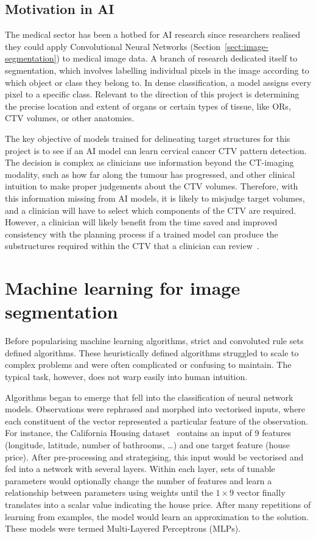 \documentclass[12pt,twoside]{report}
\begin{document}
\subsection{Motivation in AI}

The medical sector has been a hotbed for AI research since researchers realised they could apply Convolutional Neural Networks (Section~\ref{sect:image-segmentation}) to medical image data. A branch of research dedicated itself to segmentation, which involves labelling individual pixels in the image according to which object or class they belong to. In dense classification, a model assigns every pixel to a specific class. Relevant to the direction of this project is determining the precise location and extent of organs or certain types of tissue, like ORs, CTV volumes, or other anatomies. 

The key objective of models trained for delineating target structures for this project is to see if an AI model can learn cervical cancer CTV pattern detection. The decision is complex as clinicians use information beyond the CT-imaging modality, such as how far along the tumour has progressed, and other clinical intuition to make proper judgements about the CTV volumes. Therefore, with this information missing from AI models, it is likely to misjudge target volumes, and a clinician will have to select which components of the CTV are required. However, a clinician will likely benefit from the time saved and improved consistency with the planning process if a trained model can produce the substructures required within the CTV that a clinician can review~\cite{AMLART-data}.

\section{Machine learning for image segmentation}\label{sect:machine-learning-for-image-segmentation}

Before popularising machine learning algorithms, strict and convoluted rule sets defined algorithms. These heuristically defined algorithms struggled to scale to complex problems and were often complicated or confusing to maintain. The typical task, however, does not warp easily into human intuition.

Algorithms began to emerge that fell into the classification of neural network models. Observations were rephrased and morphed into vectorised inputs, where each constituent of the vector represented a particular feature of the observation. For instance, the California Housing dataset~\cite{kelleypace1997} contains an input of 9 features (longitude, latitude, number of bathrooms, \dots) and one target feature (house price). After pre-processing and strategising, this input would be vectorised and fed into a network with several layers. Within each layer, sets of tunable parameters would optionally change the number of features and learn a relationship between parameters using weights until the $1 \times 9$ vector finally translates into a scalar value indicating the house price. After many repetitions of learning from examples, the model would learn an approximation to the solution. These models were termed Multi-Layered Perceptrons (MLPs).
\end{document}
